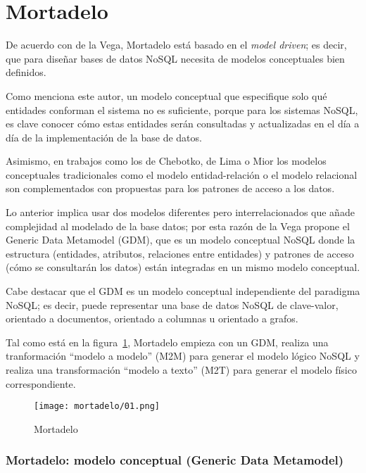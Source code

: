 \section{Mortadelo}
De acuerdo con de la Vega\cite{de_la_vega_mortadelo_2020}, Mortadelo está basado en el \textit{model driven}; es decir, que para diseñar bases de datos NoSQL necesita de modelos conceptuales bien definidos.


Como menciona este autor, un modelo conceptual que especifique solo qué entidades conforman el sistema no es suficiente, porque para los sistemas NoSQL, es clave conocer cómo estas entidades serán consultadas y actualizadas en el día a día de la implementación de la base de datos.


Asimismo, en trabajos como los de Chebotko\cite{chebotko_big_2015}, de Lima\cite{de_lima_workload-driven_2015} o Mior\cite{mior_nose_2017-1} los modelos conceptuales tradicionales como el modelo entidad-relación o el modelo relacional son complementados con propuestas para los patrones de acceso a los datos.


Lo anterior implica usar dos modelos diferentes pero interrelacionados que añade complejidad al modelado de la base datos; por esta razón de la Vega propone el Generic Data Metamodel (GDM), que es un modelo conceptual NoSQL donde la estructura (entidades, atributos, relaciones entre entidades) y patrones de acceso (cómo se consultarán los datos) están integradas en un mismo modelo conceptual.


Cabe destacar que el GDM es un modelo conceptual independiente del paradigma NoSQL; es decir, puede representar una base de datos NoSQL de clave-valor, orientado a documentos, orientado a columnas u orientado a grafos.


Tal como está en la figura~\ref{img:mortadelo-process}, Mortadelo empieza con un GDM, realiza una tranformación ``modelo a modelo'' (M2M) para generar el modelo lógico NoSQL y realiza una transformación ``modelo a texto'' (M2T) para generar el modelo físico correspondiente.


\begin{figure}[h!t] 
    \centering
    \texttt{[image: mortadelo/01.png]}
    \caption{Mortadelo}
    \label{img:mortadelo-process}
\end{figure}

\subsubsection*{Mortadelo: modelo conceptual (Generic Data Metamodel)}

